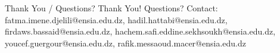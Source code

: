 \documentclass[aspectratio=169]{beamer}
\begin{document}
\begin{frame}{Thank You / Questions?}
   \centering
   \vspace*{1cm}
   {\Huge Thank You!}
   \vfill
   {\Large Questions?}
   \vfill
   \small Contact: \newline
   fatma.imene.djelili@ensia.edu.dz, hadil.hattabi@ensia.edu.dz, \newline
   firdaws.bassaid@ensia.edu.dz, hachem.safi.eddine.sekhsoukh@ensia.edu.dz, \newline
   youcef.guergour@ensia.edu.dz, rafik.messaoud.macer@ensia.edu.dz
\end{frame}
\end{document}
